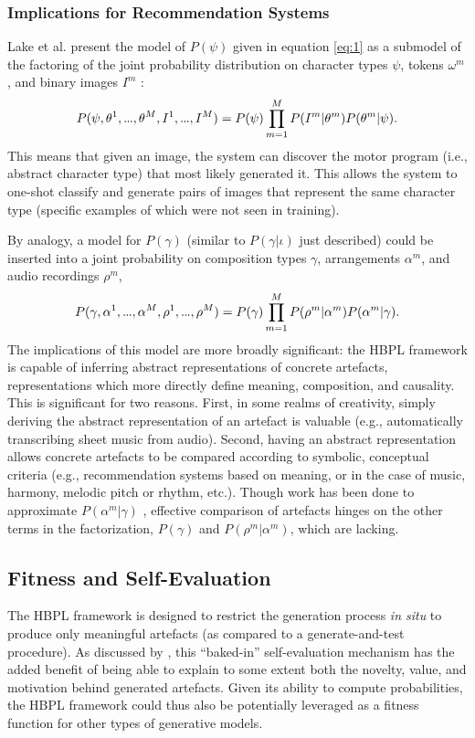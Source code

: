 \documentclass[letterpaper]{article}
\newcommand\mydots{\hbox to .75em{.\hss.\hss.}}
\begin{document}
\subsubsection{Implications for Recommendation Systems}

Lake et al. present the model of $P(\psi)$ given in equation \ref{eq:1} as a submodel of the factoring of the joint probability distribution on character types $\psi$, tokens $\omega^m$, and binary images $I^m$ :
\small
\[ P(\psi, \theta^1, \mydots,\theta^M,I^1,\mydots,I^M) = P(\psi) \prod_{m=1}^{M} P(I^m|\theta^m)P(\theta^m|\psi). \]
\normalsize
This means that given an image, the system can discover the motor program (i.e., abstract character type) that most likely generated it. This allows the system to one-shot classify and generate pairs of images that represent the same character type (specific examples of which were not seen in training). 

By analogy, a model for $P(\gamma)$ (similar to $P(\gamma|\iota)$ just described) could be inserted into a joint probability on composition types $\gamma$, arrangements $\alpha^m$, and audio recordings $\rho^m$,
\small
\[ P(\gamma,\alpha^1,\mydots,\alpha^M,\rho^1,\mydots, \rho^M) = P(\gamma) \prod_{m=1}^M P(\rho^m|\alpha^m)P(\alpha^m|\gamma). \]
\normalsize
The implications of this model are more broadly significant: the HBPL framework is capable of inferring abstract representations of concrete artefacts, representations which more directly define meaning, composition, and causality. This is significant for two reasons. First, in some realms of creativity, simply deriving the abstract representation of an artefact is valuable (e.g., automatically transcribing sheet music from audio). Second, having an abstract representation allows concrete artefacts to be compared according to symbolic, conceptual criteria (e.g., recommendation systems based on meaning, or in the case of music, harmony, melodic pitch or rhythm, etc.). Though work has been done to approximate $P(\alpha^m|\gamma)$ \cite{benetos2013automatic}, effective comparison of artefacts hinges on the other terms in the factorization, $P(\gamma)$ and $P(\rho^m|\alpha^m)$, which are lacking.

\subsection{Fitness and Self-Evaluation}

The HBPL framework is designed to restrict the generation process \emph{in situ} to produce only meaningful artefacts (as compared to a generate-and-test procedure). As discussed by \citeauthor{ventura2016mere} , this ``baked-in'' self-evaluation mechanism has the added benefit of being able to explain to some extent both the novelty, value, and motivation behind generated artefacts. Given its ability to compute probabilities, the HBPL framework could thus also be potentially leveraged as a fitness function for other types of generative models.
\end{document}
